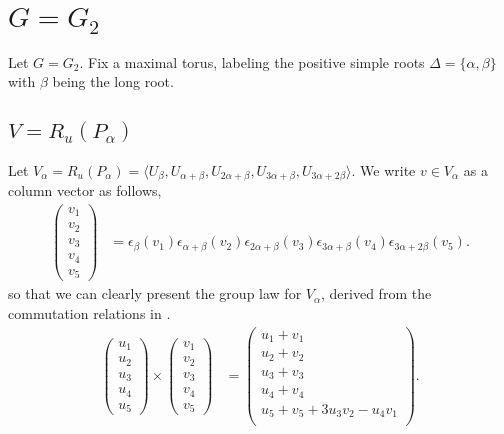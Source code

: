 \section{$G = G_2$}
\label{g2}

Let $G=G_2$. Fix a maximal torus, labeling the positive simple roots $\Delta=\{\alpha, \beta\}$ with $\beta$ being the long root. 

\subsection{$V = R_u(P_\alpha)$}
\label{g2:alpha}
Let $V_\alpha = R_u(P_\alpha) = \langle U_\beta, U_{\alpha+\beta}, U_{2\alpha+\beta}, U_{3\alpha+\beta}, U_{3\alpha+2\beta}\rangle$.
We write $v \in V_\alpha$ as a column vector as follows,
\begin{align*}
\left(\begin{matrix}
	v_1\\
	v_2\\
	v_3\\
	v_4\\
	v_5
\end{matrix}\right) &=
\epsilon_{\beta}(v_1)
\epsilon_{\alpha+\beta}(v_2)
\epsilon_{2\alpha+\beta}(v_3)
\epsilon_{3\alpha+\beta}(v_4)
\epsilon_{3\alpha+2\beta}(v_5).
\end{align*}
so that we can clearly present the group law for $V_\alpha$, derived from the commutation relations in \cite[\S 33.5]{humphreys1975linear}.
	\begin{align*}
	\left(\begin{matrix}
	u_1\\
	u_2\\
	u_3\\
	u_4\\
	u_5
	\end{matrix}\right)\times
	\left(\begin{matrix}
	v_1\\
	v_2\\
	v_3\\
	v_4\\
	v_5
	\end{matrix}\right)
 &= \left(\begin{matrix}
	u_1 + v_1\\
	u_2 + v_2\\
	u_3 + v_3\\
	u_4 + v_4\\
	u_5 + v_5 + 3u_3v_2 - u_4v_1\\
	\end{matrix}\right).
	\end{align*}
